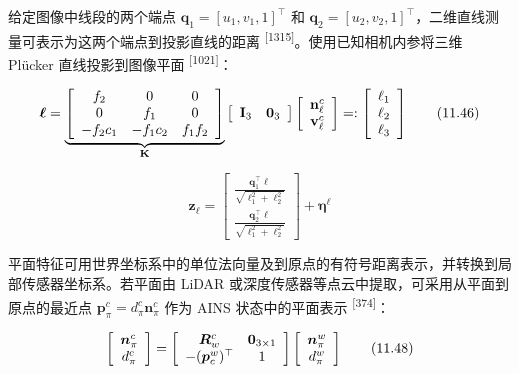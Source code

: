 给定图像中线段的两个端点 $\mathbf q_1=[u_1,v_1,1]^\top$ 和 $\mathbf q_2=[u_2,v_2,1]^\top$，二维直线测量可表示为这两个端点到投影直线的距离 \textsuperscript{[1315]}。使用已知相机内参将三维 Plücker 直线投影到图像平面 \textsuperscript{[1021]}：

\begin{equation}
\boldsymbol {\ell} = \underbrace {\left[ \begin{array}{c c c} f _ {2} & 0 & 0 \\ 0 & f _ {1} & 0 \\ - f _ {2} c _ {1} & - f _ {1} c _ {2} & f _ {1} f _ {2} \end{array} \right]} _ {\mathbf {K}} \left[ \begin{array}{c c} \mathbf {I} _ {3} & \mathbf {0} _ {3} \end{array} \right] \left[ \begin{array}{c} \mathbf {n} _ {\ell} ^ {c} \\ \mathbf {v} _ {\ell} ^ {c} \end{array} \right] =: \left[ \begin{array}{c} \ell_ {1} \\ \ell_ {2} \\ \ell_ {3} \end{array} \right]\tag{11.46}
\end{equation}

\begin{equation}
\boldsymbol {z} _ {\ell} = \left[ \begin{array}{c} \frac {\mathbf {q} _ {1} ^ {\top} \boldsymbol {\ell}}{\sqrt {\ell_ {1} ^ {2} + \ell_ {2} ^ {2}}} \\ \frac {\mathbf {q} _ {2} ^ {\top} \boldsymbol {\ell}}{\sqrt {\ell_ {1} ^ {2} + \ell_ {2} ^ {2}}} \end{array} \right] + \boldsymbol {\eta} ^ {\ell}\tag{11.47}
\end{equation}

平面特征可用世界坐标系中的单位法向量及到原点的有符号距离表示，并转换到局部传感器坐标系。若平面由 LiDAR 或深度传感器等点云中提取，可采用从平面到原点的最近点 $\mathbf p_\pi^c=d_\pi^c\mathbf n_\pi^c$ 作为 AINS 状态中的平面表示 \textsuperscript{[374]}：

\begin{equation}
\left[ \begin{array}{c} \boldsymbol {n} _ {\pi} ^ {c} \\ d _ {\pi} ^ {c} \end{array} \right] = \left[ \begin{array}{c c} \boldsymbol {R} _ {w} ^ {c} & \mathbf {0} _ {3 \times 1} \\ - (\boldsymbol {p} _ {c} ^ {w}) ^ {\top} & 1 \end{array} \right] \left[ \begin{array}{c} \boldsymbol {n} _ {\pi} ^ {w} \\ d _ {\pi} ^ {w} \end{array} \right]\tag{11.48}
\end{equation}

